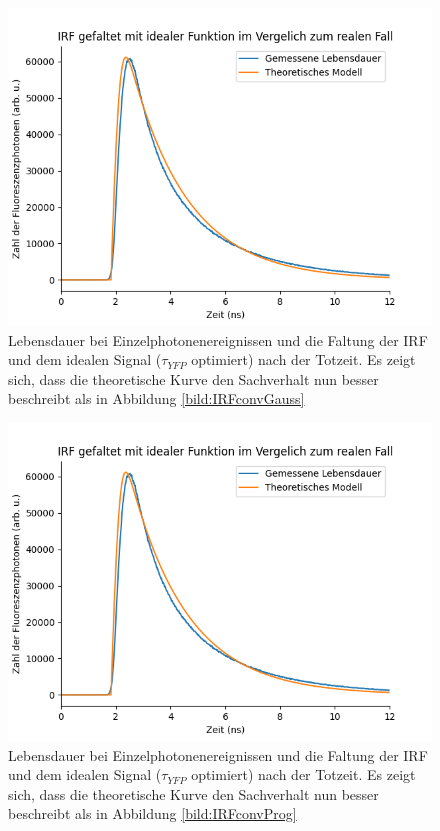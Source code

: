 \begin{figure}[h]
    \centering
    \includegraphics[width = \linewidth]{Bilder/Auswertung/IRFGaussianConvolCorrectet.png}
    \caption{Lebensdauer bei Einzelphotonenereignissen und die Faltung der IRF und dem idealen Signal ($\tau_{YFP}$ optimiert) nach der Totzeit. Es zeigt sich, dass die theoretische Kurve 
    den Sachverhalt nun besser beschreibt als in Abbildung \ref{bild:IRFconvGauss}}
    \label{bild:IRFconvGaussOpt}
\end{figure}

\begin{figure}[h]
    \centering
    \includegraphics[width = \linewidth]{Bilder/Auswertung/IRFGaussianConvolCorrectet.png}
    \caption{Lebensdauer bei Einzelphotonenereignissen und die Faltung der IRF und dem idealen Signal ($\tau_{YFP}$ optimiert) nach der Totzeit. Es zeigt sich, dass die theoretische Kurve 
    den Sachverhalt nun besser beschreibt als in Abbildung \ref{bild:IRFconvProg}}
    \label{bild:IRFconvProOpt}
\end{figure}


